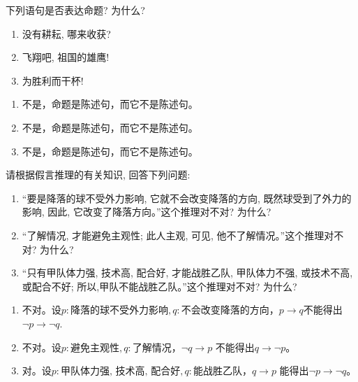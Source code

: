 \documentclass{ctexart}
\newif\ifpreface
\begin{document}
\large
\setlength{\baselineskip}{1.2em}
\ifpreface
  
  \newgeometry{left=2cm,right=2cm,top=2cm,bottom=2cm}
\else
  \maketitle
\fi
\begin{problem}\label{pro:1}
  下列语句是否表达命题? 为什么?
  \begin{enumerate}
    \item 没有耕耘, 哪来收获?
    \item 飞翔吧, 祖国的雄鹰!
    \item 为胜利而干杯!
  \end{enumerate}
\end{problem}

\begin{solution}
  \begin{enumerate}
    \item 不是，命题是陈述句，而它不是陈述句。
    \item 不是，命题是陈述句，而它不是陈述句。
    \item 不是，命题是陈述句，而它不是陈述句。
  \end{enumerate}

\end{solution}
\begin{problem}\label{pro:2}
  请根据假言推理的有关知识, 回答下列问题:
  \begin{enumerate}
    \item “要是降落的球不受外力影响, 它就不会改变降落的方向, 既然球受到了外力的影响, 因此, 它改变了降落方向。”这个推理对不对? 为什么?
    \item “了解情况, 才能避免主观性; 此人主观, 可见, 他不了解情况。”这个推理对不对? 为什么?
    \item “只有甲队体力强, 技术高, 配合好, 才能战胜乙队, 甲队体力不强, 或技术不高, 或配合不好; 所以,甲队不能战胜乙队。”这个推理对不对? 为什么?
  \end{enumerate}
\end{problem}

\begin{solution}
  \begin{enumerate}
    \item 不对。设\(p:\text{降落的球不受外力影响}, q:\text{不会改变降落的方向}\)，\(p \to q\)不能得出\(\neg p \to \neg q\).
    \item 不对。设\(p:\text{避免主观性}, q: \text{了解情况}\)，\(\neg q \to p\) 不能得出\(q \to \neg p\)。
    \item 对。设\(p:\text{甲队体力强, 技术高, 配合好}, q: \text{能战胜乙队}\)，\(q \to p\) 能得出\(\neg p \to \neg q\)。
  \end{enumerate}

\end{solution}
\end{document}
